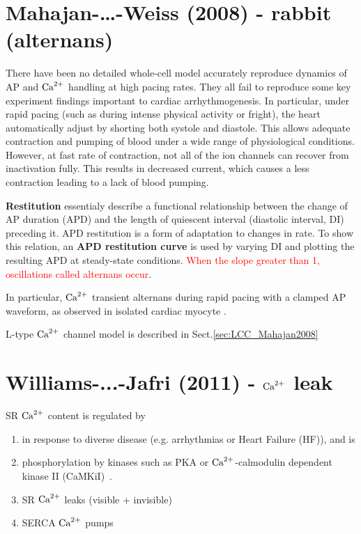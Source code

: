\section{Mahajan-\ldots-Weiss (2008) - rabbit (alternans)}
\label{sec:mahajan_weiss_2008}

There have been no detailed whole-cell model accurately reproduce dynamics of AP
and ${\text{Ca}^{2+}}$ handling at high pacing rates. They all fail to reproduce some key
experiment findings important to cardiac arrhythmogenesis. In particular, under
rapid pacing (such as during intense physical activity or fright), the heart
automatically adjust by shorting both systole and diastole. This allows adequate
contraction and pumping of blood under a wide range of physiological conditions.
However, at fast rate of contraction, not all of the ion channels can recover
from inactivation fully. This results in decreased current, which causes a less
contraction leading to a lack of blood pumping. 

{\bf Restitution} essentialy describe a functional relationship between the
change of AP duration (APD) and the length of quiescent interval (diastolic
interval, DI) preceding it. APD restitution is a form of adaptation to changes
in rate. To show this relation, an {\bf APD restitution curve} is used by
varying DI and plotting the resulting APD at steady-state conditions.
\textcolor{red}{When the slope greater than 1, oscillations called alternans
occur}.

In particular, ${\text{Ca}^{2+}}$
transient alternans during rapid pacing with a clamped AP waveform, as observed
in isolated cardiac myocyte \citep{mahajan2008}. 


L-type ${\text{Ca}^{2+}}$ channel model is described in Sect.\ref{sec:LCC_Mahajan2008}


\section{Williams-...-Jafri (2011) - ${\text{Ca}^{2+}}$ leak}
\label{sec:williams-...-jafri}

SR ${\text{Ca}^{2+}}$ content is regulated by
\begin{enumerate}

\item in response to diverse disease (e.g. arrhythmias or Heart
  Failure (HF)), and is

\item phosphorylation by kinases such as PKA or ${\text{Ca}^{2+}}$-calmodulin
  dependent kinase II (CaMKiI)~\citep{marx2000,ai2005}.

\item SR ${\text{Ca}^{2+}}$ leaks (visible + invisible)

\item SERCA ${\text{Ca}^{2+}}$ pumps
\end{enumerate}

